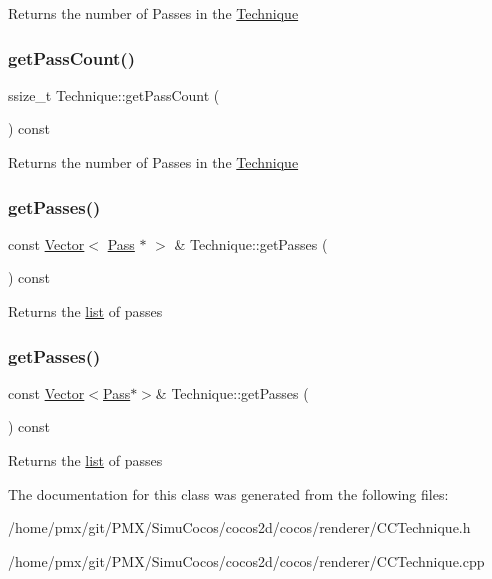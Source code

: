 Returns the number of Passes in the \hyperlink{classTechnique}{Technique} \mbox{\label{classTechnique_a6de439117a58b51d44729dafd25c9a2a}} 
\subsubsection{\texorpdfstring{get\+Pass\+Count()}{getPassCount()}\hspace{0.1cm}{\footnotesize\ttfamily [2/2]}}
{\footnotesize\ttfamily ssize\+\_\+t Technique\+::get\+Pass\+Count (\begin{DoxyParamCaption}{ }\end{DoxyParamCaption}) const}

Returns the number of Passes in the \hyperlink{classTechnique}{Technique} \mbox{\label{classTechnique_a59663f422b3c710a0ffc510d7ae86a2b}} 
\subsubsection{\texorpdfstring{get\+Passes()}{getPasses()}\hspace{0.1cm}{\footnotesize\ttfamily [1/2]}}
{\footnotesize\ttfamily const \hyperlink{classVector}{Vector}$<$ \hyperlink{classPass}{Pass} $\ast$ $>$ \& Technique\+::get\+Passes (\begin{DoxyParamCaption}{ }\end{DoxyParamCaption}) const}

Returns the \hyperlink{protocollist-p}{list} of passes \mbox{\label{classTechnique_ab730df710cbc126b4bd6fa1b53c8380b}} 
\subsubsection{\texorpdfstring{get\+Passes()}{getPasses()}\hspace{0.1cm}{\footnotesize\ttfamily [2/2]}}
{\footnotesize\ttfamily const \hyperlink{classVector}{Vector}$<$\hyperlink{classPass}{Pass}$\ast$$>$\& Technique\+::get\+Passes (\begin{DoxyParamCaption}{ }\end{DoxyParamCaption}) const}

Returns the \hyperlink{protocollist-p}{list} of passes 

The documentation for this class was generated from the following files\+:\begin{DoxyCompactItemize}
\item 
/home/pmx/git/\+P\+M\+X/\+Simu\+Cocos/cocos2d/cocos/renderer/C\+C\+Technique.\+h\item 
/home/pmx/git/\+P\+M\+X/\+Simu\+Cocos/cocos2d/cocos/renderer/C\+C\+Technique.\+cpp\end{DoxyCompactItemize}
